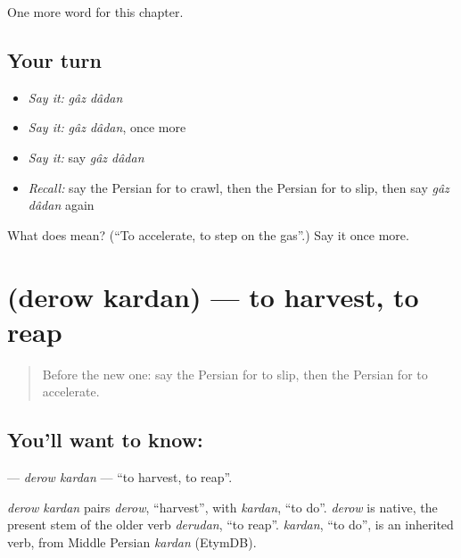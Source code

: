 \begin{grammarlens}[title={What you've built}]
One more word for this chapter.
\end{grammarlens}

\subsection*{Your turn}
\begin{itemize}
\raggedright
  \item \emph{Say it:} \emph{gâz dâdan}
  \item \emph{Say it:} \emph{gâz dâdan}, once more
  \item \emph{Say it:} say \emph{gâz dâdan}
  \item \emph{Recall:} say the Persian for to crawl, then the Persian for to slip, then say \emph{gâz dâdan} again
\end{itemize}

\begin{tcolorbox}[breakable,colback=teal!4,colframe=teal!35!black,title={Before you move on}]
What does   mean? (\textquotedblleft{}To accelerate, to step on the gas\textquotedblright{}.) Say it once more.
\end{tcolorbox}
\section[\texorpdfstring{\fa{درو} \fa{کردن} (derow kardan)}{درو کردن (derow kardan)}]{  (derow kardan) — to harvest, to reap}

\label{lesson:FA-C187-derow-kardan}



\begin{quote}
Before the new one: say the Persian for to slip, then the Persian for to accelerate.
\end{quote}

\subsection*{You'll want to know:  }
\textbf{ } — \emph{derow kardan} — \textquotedblleft{}to harvest, to reap\textquotedblright{}.

\begin{cousinweb}
\emph{derow kardan} pairs \emph{derow}, \textquotedblleft{}harvest\textquotedblright{}, with \emph{kardan}, \textquotedblleft{}to do\textquotedblright{}. \emph{derow} is native, the present stem of the older verb \emph{derudan}, \textquotedblleft{}to reap\textquotedblright{}. \emph{kardan}, \textquotedblleft{}to do\textquotedblright{}, is an inherited verb, from Middle Persian \emph{kardan} (EtymDB).
\end{cousinweb}

